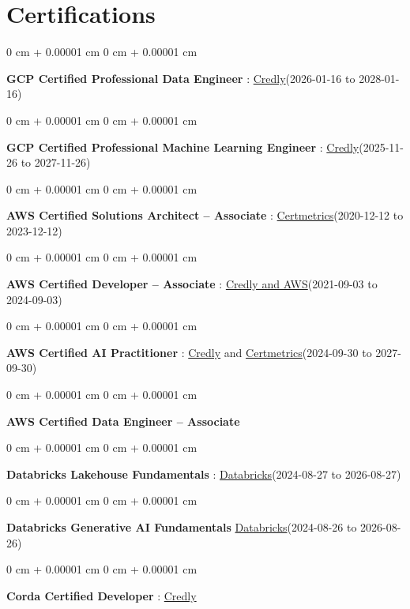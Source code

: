 \documentclass[10pt, letterpaper]{article}
\newenvironment{onecolentry}{
    \begin{adjustwidth}{
        0 cm + 0.00001 cm
    }{
        0 cm + 0.00001 cm
    }
}{
    \end{adjustwidth}
} %
\begin{document}
    \vspace{2 pt }
    \section{Certifications}
        \vspace{2 pt }
        \begin{samepage}
            \begin{onecolentry}
                \textbf{GCP Certified Professional Data Engineer} : \href{https://www.credly.com/badges/977e96d9-12e7-4f6c-b8a7-df71fb7153b8/public_url}{Credly}(2026-01-16 to 2028-01-16)
            \end{onecolentry}
            \begin{onecolentry}
                \textbf{GCP Certified Professional Machine Learning Engineer} : \href{https://www.credly.com/badges/a6965347-09ea-4d8f-b398-0e151407160d/public_url}{Credly}(2025-11-26 to 2027-11-26)
            \end{onecolentry}
            \begin{onecolentry}
                \textbf{AWS Certified Solutions Architect – Associate} : \href{https://cp.certmetrics.com/amazon/en/public/verify/credential/SNBY48EBJJVE1SWX}{Certmetrics}(2020-12-12 to 2023-12-12)
            \end{onecolentry}
            \begin{onecolentry}
                \textbf{AWS Certified Developer – Associate} : \href{https://www.credly.com/badges/b8106fbd-d3d1-4204-8cdf-e708798fd582/public_url}{Credly and AWS}(2021-09-03  to 2024-09-03)
            \end{onecolentry}
            \begin{onecolentry}
                \textbf{AWS Certified AI Practitioner} : \href{https://www.credly.com/badges/451b7ba5-8be1-4a8e-bbec-ade26627a6b6/public_url}{Credly} and \href{https://cp.certmetrics.com/amazon/en/public/verify/credential/495f0d9853874bf9a33c17f8e89ce131}{Certmetrics}(2024-09-30 to 2027-09-30)
            \end{onecolentry}
            \begin{onecolentry}
                \textbf{AWS Certified Data Engineer – Associate}
            \end{onecolentry}
            \begin{onecolentry}
                \textbf{Databricks Lakehouse Fundamentals} : \href{https://scl.io/FXGKS0u}{Databricks}(2024-08-27 to 2026-08-27)
            \end{onecolentry}
            \begin{onecolentry}
                \textbf{Databricks Generative AI Fundamentals} \href{https://sgq.io/3uIFGNi}{Databricks}(2024-08-26 to 2026-08-26)
            \end{onecolentry}
            \begin{onecolentry}
                \textbf{Corda Certified Developer} : \href{https://www.credly.com/badges/7f29d39c-34b6-4de9-b07d-e10f1090a335/linked_in_profile}{Credly}
            \end{onecolentry}
        \end{samepage}
\end{document}
